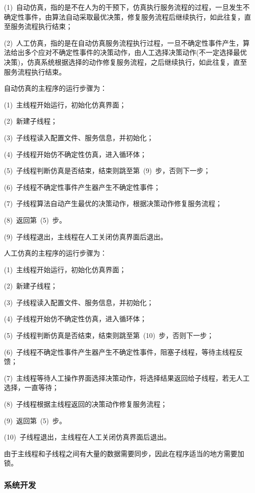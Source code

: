 (1)~自动仿真，指的是不在人为的干预下，仿真执行服务流程的过程，一旦发生不确定性事件，由算法自动采取最优决策，修复服务流程后继续执行，如此往复，直至服务流程执行结束；

(2)~人工仿真，指的是在自动仿真服务流程执行过程，一旦不确定性事件产生，算法给出多个应对不确定性事件的决策动作，由人工选择决策动作(不一定选择最优决策)，仿真系统根据选择的动作修复服务流程，之后继续执行，如此往复，直至服务流程执行结束。

自动仿真的主程序的运行步骤为：

(1)~主线程开始运行，初始化仿真界面；

(2)~新建子线程；

(3)~子线程读入配置文件、服务信息，并初始化；

(4)~子线程开始仿不确定性仿真，进入循环体；

(5)~子线程判断仿真是否结束，结束则跳至第~(9)~步，否则下一步；

(6)~子线程不确定性事件产生器产生不确定性事件；

(7)~子线程算法自动产生最优的决策动作，根据决策动作修复服务流程；

(8)~返回第~(5)~步。

(9)~子线程退出，主线程在人工关闭仿真界面后退出。

人工仿真的主程序的运行步骤为：

(1)~主线程开始运行，初始化仿真界面；

(2)~新建子线程；

(3)~子线程读入配置文件、服务信息，并初始化；

(4)~子线程开始仿不确定性仿真，进入循环体；

(5)~子线程判断仿真是否结束，结束则跳至第~(10)~步，否则下一步；

(6)~子线程不确定性事件产生器产生不确定性事件，阻塞子线程，等待主线程反馈；

(7)~主线程等待人工操作界面选择决策动作，将选择结果返回给子线程，若无人工选择，一直等待；

(8)~子线程根据主线程返回的决策动作修复服务流程；

(9)~返回第~(5)~步。

(10)~子线程退出，主线程在人工关闭仿真界面后退出。

由于主线程和子线程之间有大量的数据需要同步，因此在程序适当的地方需要加锁。

\subsubsection{系统开发}

